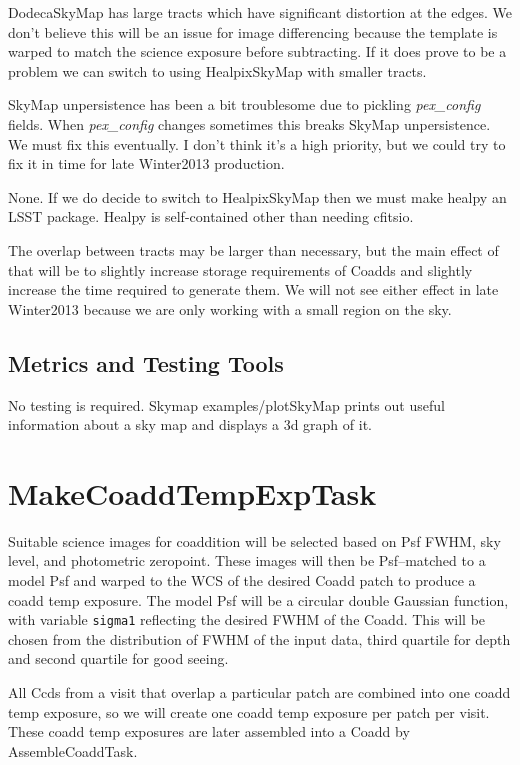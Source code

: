 \documentclass[12pt]{article}
\begin{document}
DodecaSkyMap has large tracts which have significant distortion at the edges.
We don't believe this will be an issue for image differencing because the template is warped
to match the science exposure before subtracting. If it does prove to be a problem
we can switch to using HealpixSkyMap with smaller tracts.

SkyMap unpersistence has been a bit troublesome due to pickling {\it pex\_config} fields.
When {\it pex\_config} changes sometimes this breaks SkyMap unpersistence. We must fix this eventually.
I don't think it's a high priority, but we could try to fix it in time for late Winter2013 production.

None. If we do decide to switch to HealpixSkyMap then we must make healpy an LSST package.
Healpy is self-contained other than needing cfitsio.

The overlap between tracts may be larger than necessary, but the main effect of that
will be to slightly increase storage requirements of Coadds and slightly increase
the time required to generate them. We will not see either effect in late Winter2013
because we are only working with a small region on the sky.

\subsection{Metrics and Testing Tools}

No testing is required.  Skymap examples/plotSkyMap prints out useful
information about a sky map and displays a 3d graph of it.


\section{MakeCoaddTempExpTask} 

Suitable science images for coaddition will be selected based on Psf FWHM, 
sky level, and photometric zeropoint.  These images will then be Psf--matched to a model Psf and warped
to the WCS of the desired Coadd patch to produce a coadd temp exposure.
The model Psf will be a circular double Gaussian
function, with variable {\tt sigma1} reflecting the desired FWHM of the Coadd.  This will
be chosen from the distribution of FWHM of the input data, third quartile for depth and second
quartile for good seeing.

All Ccds from a visit that overlap a particular patch are combined into one coadd temp exposure,
so we will create one coadd temp exposure per patch per visit.
These coadd temp exposures are later assembled into a Coadd by AssembleCoaddTask.
\end{document}
